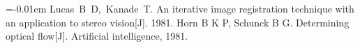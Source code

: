 \documentclass[landscape,a0paper,fontscale=0.292]{baposter}
\begin{document}
\begin{poster}
{     
     \renewcommand{\section}[2]{\vskip 0.05em}
       \begin{thebibliography}{99}\itemsep=-0.01em
       \setlength{\baselineskip}{0.4em}
        Lucas~B~D,~Kanade~T.
 	    An iterative image registration technique with an application to stereo vision[J]. 1981.     
 	   Horn B K P, Schunck B G. 
 	   \newblock Determining optical flow[J].
 	   \newblock  Artificial intelligence, 1981. 
       \end{thebibliography}
   }




\end{poster}
\end{document}
